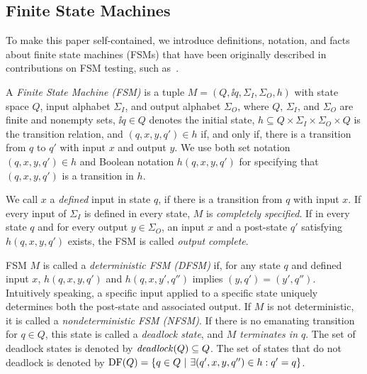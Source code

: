 %

\subsection{Finite State Machines}

To make this paper self-contained, we introduce definitions, notation, and
facts about finite state machines (FSMs) that have been originally described
in contributions on FSM testing, such
as~\cite{petrenko_testing_2011,DBLP:conf/hase/PetrenkoY14,hierons_testing_2004}.

A \emph{Finite State Machine (FSM)} is  a tuple $M=(Q, \ii{q}, \Sigma_I,
\Sigma_O,  h)$   with state space $Q$, input alphabet $\Sigma_I$, and output
alphabet $\Sigma_O$, where $Q$, $\Sigma_I$, and $\Sigma_O$ are finite and
nonempty sets, $\ii{q}\in Q$ denotes the initial state, $h\subseteq Q\times
\Sigma_I \times \Sigma_O\times Q$ is the transition relation, and
$(q,x,y,q')\in h$ if, and only if, there is a transition from $q$ to $q'$
with input $x$ and output $y$. We use  both set notation $(q,x,y,q')\in h$
and Boolean notation $h(q,x,y,q')$ for specifying that $(q,x,y,q')$ is a
transition in $h$.

We call $x$ a \emph{defined} input in state $q$, if there is a transition
from $q$  with input $x$. If every input of $\Sigma_I$ is defined in every
state, $M$ is \emph{completely specified}. If in every state $q$ and for
every output $y\in\Sigma_O$, an input $x$ and a post-state $q'$ satisfying
$h(q,x,y,q')$ exists, the FSM is called \emph{output complete}.

FSM $M$ is called a \emph{deterministic FSM (DFSM)} if, for any state $q$ and
defined input $x$, $h(q,x,y,q')$ and $h(q,x,y',q'')$ implies $(y,q') =
(y',q'')$. Intuitively speaking, a specific input applied to a specific state
uniquely determines both the post-state and associated output. If $M$ is not
deterministic, it is called a \emph{nondeterministic FSM (NFSM)}. If there is
no emanating transition for $q\in Q$, this state is called a \emph{deadlock
state}, and \emph{$M$ terminates in $q$}. The set of deadlock states is
denoted by ${\it deadlock}(Q)\subseteq Q$. The set of states that do not deadlock
is denoted by $\text{DF}(Q) = \{ q\in Q~|~\exists (q',x,y,q'')\in h: q' = q \}$.


